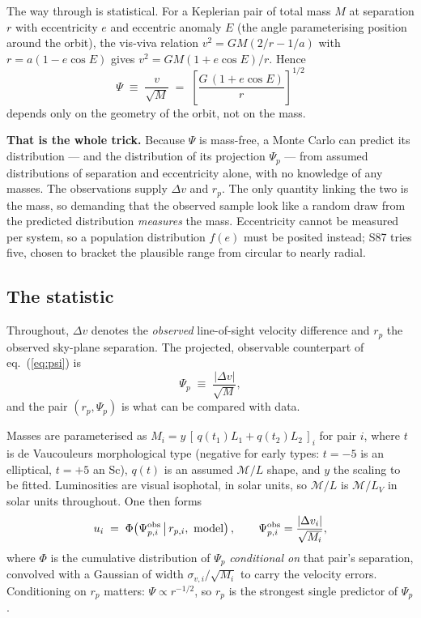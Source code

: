 \documentclass[11pt]{article}
\newcommand{\ML}{\ensuremath{\mathcal{M}/L}}
\begin{document}
The way through is statistical. For a Keplerian pair of total mass $M$ at
separation $r$ with eccentricity $e$ and eccentric anomaly $E$ (the angle
parameterising position around the orbit), the vis-viva relation
$v^2 = GM(2/r - 1/a)$ with $r = a(1-e\cos E)$ gives $v^2 = GM(1+e\cos E)/r$.
Hence
\begin{equation}
\Psi \;\equiv\; \frac{v}{\sqrt{M}}
\;=\; \left[\frac{G\,(1+e\cos E)}{r}\right]^{1/2}
\label{eq:psi}
\end{equation}
depends only on the geometry of the orbit, not on the mass.

\textbf{That is the whole trick.} Because $\Psi$ is mass-free, a Monte Carlo
can predict its distribution --- and the distribution of its projection
$\Psi_p$ --- from assumed distributions of separation and eccentricity alone,
with no knowledge of any masses. The observations supply $\Delta v$ and $r_p$.
The only quantity linking the two is the mass, so demanding that the observed
sample look like a random draw from the predicted distribution \emph{measures}
the mass. Eccentricity cannot be measured per system, so a population
distribution $f(e)$ must be posited instead; S87 tries five, chosen to bracket
the plausible range from circular to nearly radial.

\subsection{The statistic}

Throughout, $\Delta v$ denotes the \emph{observed} line-of-sight velocity
difference and $r_p$ the observed sky-plane separation. The projected,
observable counterpart of eq.~(\ref{eq:psi}) is
\begin{equation}
\Psi_p \;\equiv\; \frac{|\Delta v|}{\sqrt{M}} ,
\end{equation}
and the pair $(r_p, \Psi_p)$ is what can be compared with data.

Masses are parameterised as $M_i = y\,[\,q(t_1)L_1 + q(t_2)L_2\,]_i$ for pair
$i$, where $t$ is de Vaucouleurs morphological type (negative for early types:
$t=-5$ is an elliptical, $t=+5$ an Sc), $q(t)$ is an assumed \ML{} shape, and
$y$ the scaling to be fitted. Luminosities are visual isophotal, in solar
units, so \ML{} is $\mathcal{M}/L_V$ in solar units throughout. One then forms
\begin{equation}
u_i \;=\; \Phi\!\left(\Psi_{p,i}^{\rm obs} \,\middle|\, r_{p,i},\ \mathrm{model}\right),
\qquad
\Psi_{p,i}^{\rm obs} = \frac{|\Delta v_i|}{\sqrt{M_i}} ,
\label{eq:u}
\end{equation}
where $\Phi$ is the cumulative distribution of $\Psi_p$ \emph{conditional on}
that pair's separation, convolved with a Gaussian of width
$\sigma_{v,i}/\sqrt{M_i}$ to carry the velocity errors. Conditioning on $r_p$
matters: $\Psi \propto r^{-1/2}$, so $r_p$ is the strongest single predictor of
$\Psi_p$.
\end{document}
